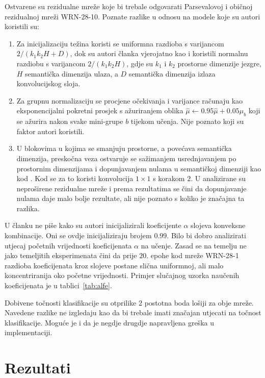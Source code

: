 \documentclass[utf8, seminar, numeric, lmodern]{feri}
\begin{document}
Ostvarene su rezidualne mreže koje bi trebale odgovarati Parsevalovoj i običnoj rezidualnoj mreži WRN-28-10. Poznate razlike u odnosu na modele koje su autori koristili su:
\begin{enumerate}
\item Za inicijalizaciju težina koristi se uniformna razdioba s varijancom $2/(k_1k_2H+D)$, dok su autori članka vjerojatno kao i \cite{zagoruyko16-wrn} koristili normalnu razdiobu s varijancom $2/(k_1k_2H)$, gdje su $k_1$ i $k_2$ prostorne dimenzije jezgre, $H$ semantička dimenzija ulaza, a $D$ semantička dimenzija izlaza konvolucijskog sloja.
\item Za grupnu normalizaciju se procjene očekivanja i varijance računaju kao eksponencijalni pokretni prosjek s ažuriranjem oblika $\hat{\mu}\gets0.95\hat{\mu}+0.05\mu_b$ koji se ažurira nakon svake mini-grupe $b$ tijekom učenja. Nije poznato koji su faktor autori koristili.
\item U blokovima u kojima se smanjuju prostorne, a povećava semantička dimenzija, preskočna veza ostvaruje se sažimanjem usrednjavanjem po prostornim dimenzijama i dopunjavanjem nulama u semantičkoj dimenziji kao kod \cite{he15-resnet, he16-resnet-imdrn}. Kod \cite{zagoruyko16-wrn} se za to koristi konvolucija $1\times1$ s korakom $2$. U \cite{he16-resnet-imdrn} analizirane su neproširene rezidualne mreže i prema rezultatima se čini da dopunjavanje nulama daje malo bolje rezultate, ali nije poznato s koliko je značajna ta razlika.
\end{enumerate}
U članku ne piše kako su autori inicijalizirali koeficijente $\alpha$ slojeva konveksne kombinacije. Oni se ovdje inicijaliziraju brojem $0.99$. Bilo bi dobro analizirati utjecaj početnih vrijednosti koeficijenata $\alpha$ na učenje. Zasad se na temelju ne jako temeljitih eksperimenata čini da prije $20.$ epohe kod mreže WRN-28-1 razdioba koeficijenata kroz slojeve postane slična uniformnoj, ali malo koncentriranija oko početne vrijednosti. Primjer slučajnog uzorka naučenih koeficijenata je u tablici~\ref{tab:alfe}. %

Dobivene točnosti klasifikacije su otprilike $2$ postotna boda lošiji za obje mreže. Navedene razlike ne izgledaju kao da bi trebale imati značajan utjecati na točnost klasifikacije. Moguće je i da je negdje drugdje napravljena greška u implementaciji.


\section{Rezultati} 
\end{document}
